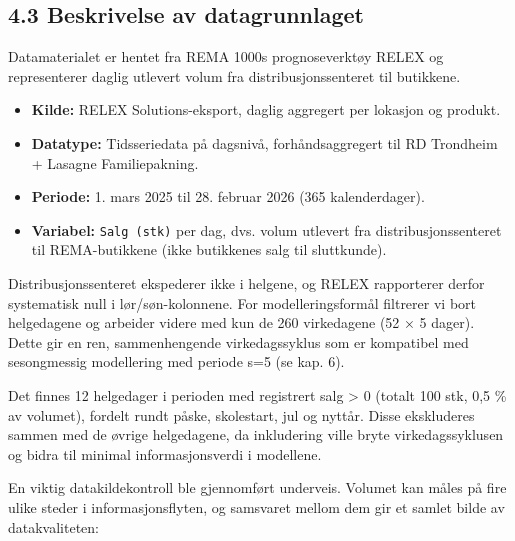 \documentclass[
  norsk,
  11pt,
  a4paper,
]{article}
\providecommand{\tightlist}{%
  \setlength{\itemsep}{0pt}\setlength{\parskip}{0pt}}
\begin{document}
\subsection{4.3 Beskrivelse av
datagrunnlaget}\label{beskrivelse-av-datagrunnlaget}

Datamaterialet er hentet fra REMA 1000s prognoseverktøy RELEX og
representerer daglig utlevert volum fra distribusjonssenteret til
butikkene.

\begin{itemize}
\tightlist
\item
  \textbf{Kilde:} RELEX Solutions-eksport, daglig aggregert per lokasjon
  og produkt.
\item
  \textbf{Datatype:} Tidsseriedata på dagsnivå, forhåndsaggregert til RD
  Trondheim + Lasagne Familiepakning.
\item
  \textbf{Periode:} 1. mars 2025 til 28. februar 2026 (365
  kalenderdager).
\item
  \textbf{Variabel:} \texttt{Salg\ (stk)} per dag, dvs. volum utlevert
  fra distribusjonssenteret til REMA-butikkene (ikke butikkenes salg til
  sluttkunde).
\end{itemize}

Distribusjonssenteret ekspederer ikke i helgene, og RELEX rapporterer
derfor systematisk null i lør/søn-kolonnene. For modelleringsformål
filtrerer vi bort helgedagene og arbeider videre med kun de 260
virkedagene (52 × 5 dager). Dette gir en ren, sammenhengende
virkedagssyklus som er kompatibel med sesongmessig modellering med
periode s=5 (se kap. 6).

Det finnes 12 helgedager i perioden med registrert salg \textgreater{} 0
(totalt 100 stk, 0,5 \% av volumet), fordelt rundt påske, skolestart,
jul og nyttår. Disse ekskluderes sammen med de øvrige helgedagene, da
inkludering ville bryte virkedagssyklusen og bidra til minimal
informasjonsverdi i modellene.

En viktig datakildekontroll ble gjennomført underveis. Volumet kan måles
på fire ulike steder i informasjonsflyten, og samsvaret mellom dem gir
et samlet bilde av datakvaliteten:
\end{document}
